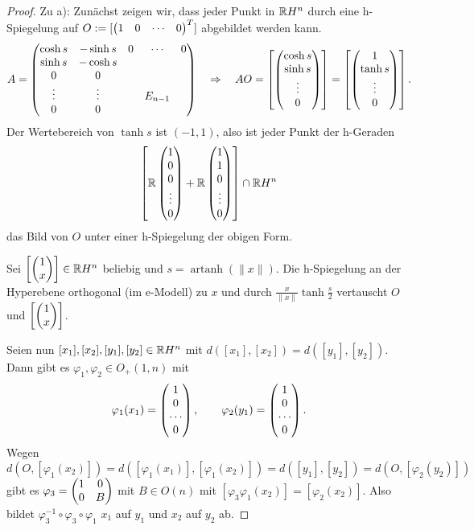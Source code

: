 \begin{proof}
  Zu a): Zunächst zeigen wir, dass jeder Punkt in $\mathbb{R} H^n$ durch eine
  h-Spiegelung auf $O := [ \begin{pmatrix}1 & 0 & \cdots & 0\end{pmatrix}^T ]$ abgebildet werden
  kann.
  \[ A = \begin{pmatrix}
      \cosh s & - \sinh s & 0 & \cdots & 0 \\
      \sinh s & - \cosh s \\
      0 & 0 \\
      \vdots & \vdots & & E_{n-1} \\
      0 & 0
    \end{pmatrix}
    \quad \Rightarrow \quad
  AO = \left[ \begin{pmatrix} \cosh s \\ \sinh s \\ \vdots \\ 0\end{pmatrix} \right] = \left[\begin{pmatrix} 1
      \\ \tanh s \\ \vdots \\ 0\end{pmatrix} \right]. \]
  Der Wertebereich von $\tanh s$ ist $(-1,1)$, also ist jeder Punkt der h-Geraden
  \[ \left[ \mathbb{R} \begin{pmatrix} 1 \\ 0 \\ 0 \\ \vdots \\ 0\end{pmatrix} + \mathbb{R} \begin{pmatrix} 1 \\ 1 \\ 0
        \\ \vdots \\ 0\end{pmatrix} \right] \cap \mathbb{R} H^n \]
  das Bild von $O$ unter einer h-Spiegelung der obigen Form.

  Sei $\left[ \begin{pmatrix}1 \\ x\end{pmatrix} \right] \in \mathbb{R} H^n$ beliebig und $s =
  \operatorname{artanh} (\|x\|)$. Die h-Spiegelung an der Hyperebene orthogonal
  (im e-Modell) zu $x$ und durch $\frac{x}{\|x\|} \tanh \frac{s}{2}$ vertauscht
  $O$ und $\left[ \begin{pmatrix}1 \\ x\end{pmatrix} \right]$.

  Seien nun $[x_1], [x_2], [y_1], [y_2] \in \mathbb{R} H^n$ mit $d([x_1],[x_2]) =
  d([y_1],[y_2])$. Dann gibt es $\varphi_1, \varphi_2 \in O_+(1,n)$ mit
  \[ \varphi_1(x_1) = \begin{pmatrix}1 \\ 0 \\ \cdots \\ 0\end{pmatrix}, \qquad \varphi_2(y_1) =
    \begin{pmatrix}1 \\ 0 \\ \cdots \\ 0\end{pmatrix}. \]
  Wegen
  \[ d(O, [\varphi_1(x_2)]) = d([\varphi_1(x_1)], [\varphi_1(x_2)]) =
    d([y_1],[y_2]) = d(O,[\varphi_2(y_2)]) \]
  gibt es $\varphi_3= \begin{pmatrix}1 & 0 \\ 0 & B\end{pmatrix}$ mit $B \in O(n)$ mit $[\varphi_3
  \varphi_1(x_2)] = [\varphi_2(x_2)]$. Also bildet $\varphi_3^{-1} \circ
  \varphi_3 \circ \varphi_1$ $x_1$ auf $y_1$ und $x_2$ auf $y_2$ ab.


\end{proof}

